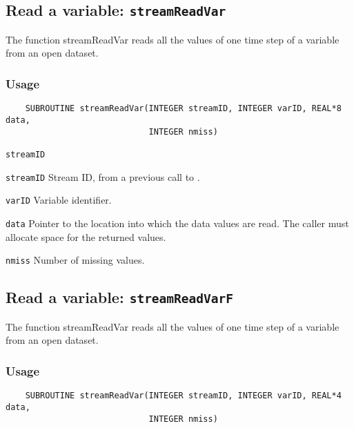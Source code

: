 

\subsection{Read a variable: \texttt{streamReadVar}}
\label{streamReadVar}

The function streamReadVar reads all the values of one time step of a variable
from an open dataset.
\subsubsection*{Usage}

\begin{verbatim}
    SUBROUTINE streamReadVar(INTEGER streamID, INTEGER varID, REAL*8 data, 
                             INTEGER nmiss)
\end{verbatim}

\hspace*{4mm}\begin{minipage}[]{15cm}
\begin{deflist}{\texttt{streamID}\ }
\item[\texttt{streamID}]
Stream ID, from a previous call to {}.
\item[\texttt{varID}]
Variable identifier.
\item[\texttt{data}]
Pointer to the location into which the data values are read.
                     The caller must allocate space for the returned values.
\item[\texttt{nmiss}]
Number of missing values.

\end{deflist}
\end{minipage}


\subsection{Read a variable: \texttt{streamReadVarF}}
\label{streamReadVarF}

The function streamReadVar reads all the values of one time step of a variable
from an open dataset.
\subsubsection*{Usage}

\begin{verbatim}
    SUBROUTINE streamReadVar(INTEGER streamID, INTEGER varID, REAL*4 data, 
                             INTEGER nmiss)
\end{verbatim}

